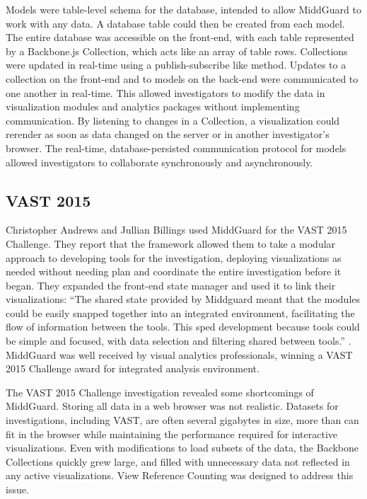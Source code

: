 \documentclass[midd]{thesis}
\begin{document}
Models were table-level schema for the database, intended to allow MiddGuard to
work with any data. A database table could then be created from each model. The
entire database was accessible on the front-end, with each table represented by
a Backbone.js Collection, which acts like an array of table rows. Collections
were updated in real-time using a publish-subscribe like method. Updates to a
collection on the front-end and to models on the back-end were communicated to
one another in real-time. This allowed investigators to modify the data in
visualization modules and analytics packages without implementing communication.
By listening to changes in a Collection, a visualization could rerender as soon
as data changed on the server or in another investigator's browser. The
real-time, database-persisted communication protocol for models allowed
investigators to collaborate synchronously and asynchronously.

\subsection{VAST 2015}

Christopher Andrews and Jullian Billings used MiddGuard for the VAST 2015
Challenge. They report that the framework allowed them to take a modular
approach to developing tools for the investigation, deploying visualizations as
needed without needing plan and coordinate the entire investigation before it
began. They expanded the front-end state manager and used it to link their
visualizations: ``The shared state provided by Middguard meant that the modules
could be easily snapped together into an integrated environment, facilitating
the flow of information between the tools. This sped development because tools
could be simple and focused, with data selection and filtering shared between
tools.'' \cite{middguard-dinofunworld}. MiddGuard was well received by visual
analytics professionals, winning a VAST 2015 Challenge award for integrated
analysis environment.

The VAST 2015 Challenge investigation revealed some shortcomings of MiddGuard.
Storing all data in a web browser was not realistic. Datasets for
investigations, including VAST, are often several gigabytes in size, more than
can fit in the browser while maintaining the performance required for
interactive visualizations. Even with modifications to load subsets of the data,
the Backbone Collections quickly grew large, and filled with unnecessary data
not reflected in any active visualizations. View Reference Counting was designed
to address this issue.
\end{document}
